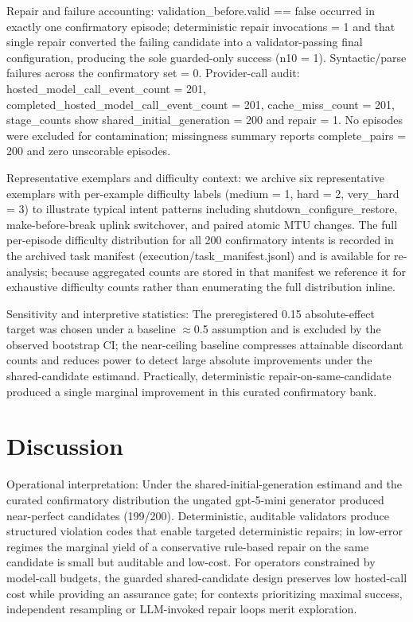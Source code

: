 \documentclass[conference]{IEEEtran}
\begin{document}
Repair and failure accounting: validation\_before.valid == false occurred in exactly one confirmatory episode; deterministic repair invocations = 1 and that single repair converted the failing candidate into a validator-passing final configuration, producing the sole guarded-only success (n10 = 1). Syntactic/parse failures across the confirmatory set = 0. Provider-call audit: hosted\_model\_call\_event\_count = 201, completed\_hosted\_model\_call\_event\_count = 201, cache\_miss\_count = 201, stage\_counts show shared\_initial\_generation = 200 and repair = 1. No episodes were excluded for contamination; missingness summary reports complete\_pairs = 200 and zero unscorable episodes.

Representative exemplars and difficulty context: we archive six representative exemplars with per-example difficulty labels (medium = 1, hard = 2, very\_hard = 3) to illustrate typical intent patterns including shutdown\_configure\_restore, make-before-break uplink switchover, and paired atomic MTU changes. The full per-episode difficulty distribution for all 200 confirmatory intents is recorded in the archived task manifest (execution/task\_manifest.jsonl) and is available for re-analysis; because aggregated counts are stored in that manifest we reference it for exhaustive difficulty counts rather than enumerating the full distribution inline.

Sensitivity and interpretive statistics: The preregistered 0.15 absolute-effect target was chosen under a baseline \ensuremath{\approx}0.5 assumption and is excluded by the observed bootstrap CI; the near-ceiling baseline compresses attainable discordant counts and reduces power to detect large absolute improvements under the shared-candidate estimand. Practically, deterministic repair-on-same-candidate produced a single marginal improvement in this curated confirmatory bank.

\section{Discussion}
Operational interpretation: Under the shared-initial-generation estimand and the curated confirmatory distribution the ungated gpt-5-mini generator produced near-perfect candidates (199/200). Deterministic, auditable validators produce structured violation codes that enable targeted deterministic repairs; in low-error regimes the marginal yield of a conservative rule-based repair on the same candidate is small but auditable and low-cost. For operators constrained by model-call budgets, the guarded shared-candidate design preserves low hosted-call cost while providing an assurance gate; for contexts prioritizing maximal success, independent resampling or LLM-invoked repair loops merit exploration.
\end{document}
